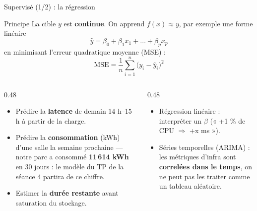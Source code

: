 \begin{frame}{Supervisé (1/2) : la régression}
\begin{block}{Principe}
La cible $y$ est \textbf{continue}. On apprend $f(x) \approx y$, par exemple une forme linéaire
\[
\hat{y} = \beta_0 + \beta_1 x_1 + \dots + \beta_p x_p
\]
en minimisant l'erreur quadratique moyenne (MSE) :
\[
\mathrm{MSE} = \frac{1}{n}\sum_{i=1}^{n}\bigl(y_i - \hat{y}_i\bigr)^2
\]
\end{block}
\begin{columns}[t]
\begin{column}{0.48\textwidth}
\begin{ebox}
\begin{itemize}
\item Prédire la \textbf{latence} de demain 14 h--15 h à partir de la charge.
\item Prédire la \textbf{consommation} (kWh) d'une salle la semaine prochaine
--- notre parc a consommé \textbf{11\,614 kWh} en 30 jours : le modèle du TP de la
séance 4 partira de ce chiffre.
\item Estimer la \textbf{durée restante} avant saturation du stockage.
\end{itemize}
\end{ebox}
\end{column}
\begin{column}{0.48\textwidth}
\begin{kbox}
\begin{itemize}
\item Régression linéaire : interpréter un $\beta$ (« +1 \% de CPU $\Rightarrow$ +x ms »).
\item Séries temporelles (ARIMA) : les métriques d'infra sont \textbf{correlées dans le temps},
on ne peut pas les traiter comme un tableau aléatoire.
\end{itemize}
\end{kbox}
\end{column}
\end{columns}
\end{frame}

